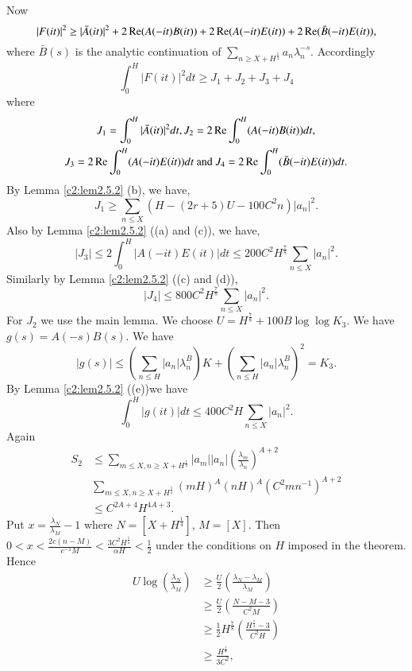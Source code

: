 Now\pageoriginale
{\fontsize{10}{12}\selectfont
$$
|F(it)|^2 \geq |\bar{A}(it)|^2 + 2 \operatorname{Re} (A(-it) B(it)) + 2 \operatorname{Re} (A (-it)
E (it)) + 2 \operatorname{Re} (\bar{B} (-it) E (it)), 
$$}
where $\bar{B}(s)$ is the analytic continuation of $\sum\limits_{n \geq X + H^{\frac{1}{4}}} a_n\lambda^{-s}_n$. Accordingly
\begin{equation*}
\int^H_0 |F(it)|^2 dt \geq J_1 + J_2 + J_3 + J_4 \tag{2.5.3}\label{c2:eq2.5.3}
\end{equation*}
where 
\begin{gather*}
J_1 =\int^{H}_0 |\bar{A}(it)|^2 dt, J_2 = 2 \operatorname{Re} \int^H_0 (A(-it) B(it))dt,\\
J_3 = 2 \operatorname{Re} \int^H_0 (A(-it) E(it)) dt \text{ and } J_4 = 2 \operatorname{Re} \int^H_0 (\bar{B}(-it) E(it))dt.
\end{gather*}
By Lemma \ref{c2:lem2.5.2} (b), we have,
$$
J_1 \geq \sum\limits_{n \leq X} (H - (2r + 5) U - 100 C^2 n) |a_n|^2.
$$
Also by Lemma \ref{c2:lem2.5.2} ((a) and (c)), we have,
$$
|J_3| \leq 2 \int^H_0 |A(-it) E(it)| dt \leq 200 C^2 H^{\frac{7}{8}} \sum\limits_{n \leq X} |a_n|^2. 
$$
Similarly by Lemma \ref{c2:lem2.5.2} ((c) and (d)),
$$
|J_4| \leq 800 C^2 H^{\frac{7}{8}} \sum\limits_{n\leq X} |a_n|^2.
$$
For $J_2$ we use the main lemma. We choose $U = H^{\frac{7}{8}} + 100 B \log \log K_3$. We have $g(s) = A(-s) B (s)$. We have 
$$
|g(s)| \leq \left( \sum\limits_{n\leq H} |a_n| \lambda^B_n \right) K + \left( \sum\limits_{n\leq H} |a_n| \lambda^B_n \right)^2 = K_3.
$$
By Lemma \ref{c2:lem2.5.2} ((e))\pageoriginale we have
$$
\int^H_0 |g(it)| dt \leq 400 C^2 H \sum\limits_{n\leq X} |a_n|^2.
$$
Again
\begin{align*}
S_2 & \leq \sum\limits_{m\leq X, n \geq X + H^{\frac{1}{4}}} | a_m ||a_n|  \left(\frac{\lambda_m}{\lambda_n} \right)^{A+2}\\
& \sum\limits_{m \leq X , n \geq  X+ H^{\frac{1}{4}}} (mH)^A (nH)^A (C^2 mn^{-1})^{A+2}\\
& \leq C^{2A+ 4} H^{4A+3}.
\end{align*}
Put $x = \frac{\lambda_N}{\lambda_M} - 1$ where $N = \left[X+H^{\frac{1}{4}} \right]$, $M = [X]$. Then $0 < x < \frac{2c(n-M)}{c^{-1}M} < \frac{3C^2 H^{\frac{1}{4}}}{\alpha H} < \frac{1}{2}$ under the conditions on $H$ imposed in the theorem. Hence
\begin{align*}
U \log\left(\frac{\lambda_N}{\lambda_M}\right) &\geq \frac{U}{2}
\left(\frac{\lambda_N - \lambda_M}{\lambda_M} \right)\\ 
&\geq \frac{U}{2} \left(\frac{N-M-3}{C^2 M} \right)\\ 
&\geq \frac{1}{2} H^{\frac{7}{8}} \left(\frac{H^{\frac{1}{4}} - 3}{C^2
  H} \right)\\
&\geq \frac{H^{\frac{1}{8}}}{3C^2},
\end{align*}
